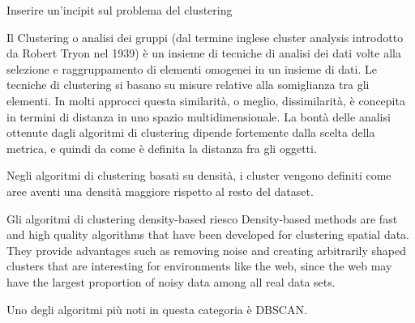 

\color{red}
Inserire un'incipit sul problema del clustering
\color{black}


Il Clustering o analisi dei gruppi (dal termine inglese cluster analysis introdotto da Robert
Tryon nel 1939) è un insieme di tecniche di analisi dei dati volte alla selezione e raggruppamento di elementi omogenei in un insieme di dati. Le tecniche di clustering si basano
su misure relative alla somiglianza tra gli elementi. In molti approcci questa similarità, o meglio, dissimilarità, è concepita in termini di distanza in uno spazio multidimensionale. La bontà delle analisi ottenute dagli algoritmi di clustering dipende fortemente dalla scelta
della metrica, e quindi da come è definita la distanza fra gli oggetti.

Negli algoritmi di clustering basati su densità, i cluster vengono definiti come aree aventi una densità maggiore rispetto al resto del dataset.

Gli algoritmi di clustering density-based   
riesco 
 Density-based methods are fast and high quality algorithms that have been developed for clustering spatial data. They provide advantages such as removing noise and creating arbitrarily shaped clusters that are interesting for environments like the web, since the web may have the largest proportion of noisy data among all real data sets.

 Uno degli algoritmi più noti in questa categoria è DBSCAN.  
